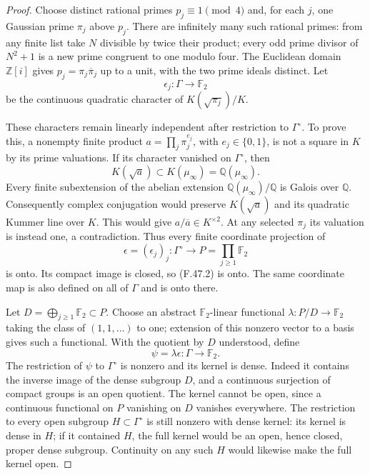 \documentclass[11pt,oneside]{article}
\begin{document}
\begin{proof}
Choose distinct rational primes $p_j\equiv1\pmod4$ and,
for each $j$, one Gaussian prime $\pi_j$ above $p_j$.
There are infinitely many such rational primes: from any
finite list take $N$ divisible by twice their product;
every odd prime divisor of $N^2+1$ is a new prime
congruent to one modulo four. The Euclidean domain
$\mathbb Z[i]$ gives
$p_j=\pi_j\overline\pi_j$ up to a unit, with the two
prime ideals distinct. Let
\[
 \epsilon_j:\Gamma\longrightarrow\mathbb F_2
\]
be the continuous quadratic character of
$K(\sqrt{\pi_j})/K$.

These characters remain linearly independent after
restriction to $\Gamma^\circ$. To prove this, a nonempty
finite product $a=\prod_j\pi_j^{e_j}$, with
$e_j\in\{0,1\}$, is not a square in $K$ by its prime
valuations. If its character vanished on
$\Gamma^\circ$, then
\[
 K(\sqrt a)\subset K(\mu_\infty)=\mathbb Q(\mu_\infty).
 \tag{F.47.1}
\]
Every finite subextension of the abelian extension
$\mathbb Q(\mu_\infty)/\mathbb Q$ is Galois over
$\mathbb Q$. Consequently complex conjugation would
preserve $K(\sqrt a)$ and its quadratic Kummer line
over $K$. This would give
$a/\overline a\in K^{\times2}$. At any selected
$\pi_j$ its valuation is instead one, a contradiction.
Thus every finite coordinate projection of
\[
 \epsilon=(\epsilon_j)_j:\Gamma^\circ
       \longrightarrow P=\prod_{j\ge1}\mathbb F_2
 \tag{F.47.2}
\]
is onto. Its compact image is closed, so (F.47.2) is
onto. The same coordinate map is also defined on all
of $\Gamma$ and is onto there.

Let $D=\bigoplus_{j\ge1}\mathbb F_2\subset P$.
Choose an abstract $\mathbb F_2$-linear functional
$\lambda:P/D\to\mathbb F_2$ taking the class of
$(1,1,\ldots)$ to one; extension of this nonzero vector
to a basis gives such a functional. With the quotient
by $D$ understood, define
\[
 \psi=\lambda\epsilon:\Gamma\longrightarrow\mathbb F_2.
 \tag{F.47.3}
\]
The restriction of $\psi$ to $\Gamma^\circ$ is nonzero
and its kernel is dense. Indeed it contains the inverse
image of the dense subgroup $D$, and a continuous
surjection of compact groups is an open quotient. The
kernel cannot be open, since a continuous functional on
$P$ vanishing on $D$ vanishes everywhere. The restriction
to every open subgroup $H\subset\Gamma^\circ$ is still
nonzero with dense kernel: its kernel is dense in $H$;
if it contained $H$, the full kernel would be an open,
hence closed, proper dense subgroup. Continuity on any
such $H$ would likewise make the full kernel open.


\end{proof}
\end{document}
